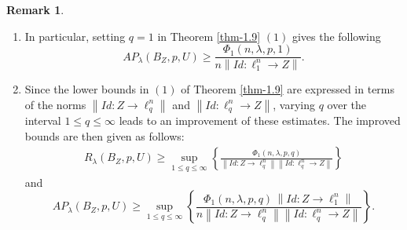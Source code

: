 \documentclass[a4paper,11pt, reqno]{amsart}
\theoremstyle{definition}
\newtheorem{rem}{Remark}[section]
\newcommand{\norm}[1]{\left\lVert#1\right\rVert}
\begin{document}
\begin{rem}
\begin{enumerate}
	\item In particular, setting $q=1$ in Theorem \ref{thm-1.9} $(1)$ gives the following
		\begin{equation*}
		AP_{\lambda}(B_{Z}, p,U) \geq \frac{\Phi_{1}(n,\lambda,p,1)}{n \norm{Id:\ell^n _1 \rightarrow Z}}.
	\end{equation*}
	
	\item Since the lower bounds in $(1)$ of Theorem \ref{thm-1.9} are expressed in terms of the norms $\norm{Id:Z \rightarrow \ell^n _q}$ and $\norm{Id:\ell^n _q \rightarrow Z}$, varying $q$ over the interval $1 \leq q \leq \infty$ leads to an improvement of these estimates. The improved bounds are then given as follows:
	\begin{align*}
		R_{\lambda}(B_{Z}, p,U) \geq 
		\sup_{1\leq q \leq \infty} \left\{\frac{\Phi_{1}(n,\lambda,p,q)}{\norm{Id:Z \rightarrow \ell^n _q} \norm{Id:\ell^n _q \rightarrow Z}}\right\}
	\end{align*} 
	and
	\begin{equation*}
		AP_{\lambda}(B_{Z}, p,U) \geq 
		\sup_{1\leq q \leq \infty} \left\{\frac{\Phi_{1}(n,\lambda,p,q)\, \norm{Id:Z \rightarrow \ell^n _1}}{n\norm{Id:Z \rightarrow \ell^n _q} \norm{Id:\ell^n _q \rightarrow Z}}\right\}.
	\end{equation*}
\end{enumerate}
\end{rem}	
	 
\end{document}
